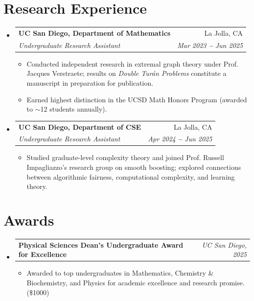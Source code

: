 \documentclass[letterpaper,11pt]{article}
\makeatletter
\newcommand{\resumeItem}[1]{
  \item\small{
    {#1 \vspace{-1pt}}
  }
}
\newcommand{\resumeSubheading}[4]{
  \vspace{-2pt}\item
    \begin{tabular*}{0.97\textwidth}[t]{l@{\extracolsep{\fill}}r}
      \textbf{#1} & #2 \\
      \textit{\small#3} & \textit{\small #4} \\
    \end{tabular*}\vspace{-2pt}
}
\newcommand{\resumeSubSubheading}[2]{
    \vspace{-2pt}\item
    \begin{tabular*}{0.97\textwidth}{l@{\extracolsep{\fill}}r}
      \textbf{\small#1} & \textit{\small #2} \\
    \end{tabular*}\vspace{-5pt}
}
\newcommand{\resumeSubHeadingListStart}{\begin{itemize}[leftmargin=0.15in, label={}]}
\newcommand{\resumeSubHeadingListEnd}{\end{itemize}}
\newcommand{\resumeItemListStart}{\begin{itemize}\vspace{-2pt}}
\newcommand{\resumeItemListEnd}{\end{itemize}\vspace{-7pt}}
\makeatother
\begin{document}

\section{Research Experience}
\resumeSubHeadingListStart

  \resumeSubheading
    {UC San Diego, Department of Mathematics}{La Jolla, CA}
    {Undergraduate Research Assistant}{Mar 2023 \textbf{--} Jun 2025}
    \resumeItemListStart
      \resumeItem{Conducted independent research in extremal graph theory under Prof. Jacques Verstraete; results on \textit{Double Turán Problems} constitute a manuscript in preparation for publication.}
      \resumeItem{Earned highest distinction in the UCSD Math Honors Program (awarded to $\sim$12 students annually).}
    \resumeItemListEnd

  \resumeSubheading
    {UC San Diego, Department of CSE}{La Jolla, CA}
    {Undergraduate Research Assistant}{Apr 2024 \textbf{--} Jun 2025}
    \resumeItemListStart
      \resumeItem{Studied graduate-level complexity theory and joined Prof. Russell Impagliazzo's research group on smooth boosting; explored connections between algorithmic fairness, computational complexity, and learning theory.}
    \resumeItemListEnd

\resumeSubHeadingListEnd


\section{Awards}
\resumeSubHeadingListStart
  \resumeSubSubheading{Physical Sciences Dean's Undergraduate Award for Excellence}{UC San Diego, 2025}
  \resumeItemListStart
    \resumeItem{Awarded to top undergraduates in Mathematics, Chemistry \& Biochemistry, and Physics for academic excellence and research promise. (\$1000)}
  \resumeItemListEnd
\resumeSubHeadingListEnd

\end{document}
